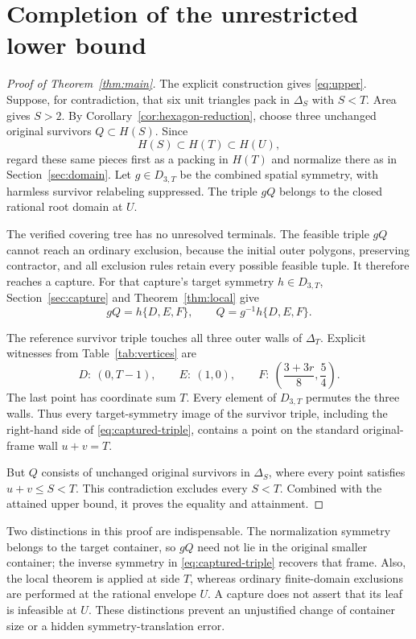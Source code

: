 \documentclass[11pt]{article}
\begin{document}
\section{Completion of the unrestricted lower bound}\label{sec:completion}

\begin{proof}[Proof of Theorem~\ref{thm:main}]
The explicit construction gives \eqref{eq:upper}. Suppose, for contradiction, that six unit triangles pack in $\Delta_S$ with $S<T$. Area gives $S>2$. By Corollary~\ref{cor:hexagon-reduction}, choose three unchanged original survivors $Q\subset H(S)$. Since
\[
 H(S)\subset H(T)\subset H(U),
\]
regard these same pieces first as a packing in $H(T)$ and normalize there as in Section~\ref{sec:domain}. Let $g\in D_{3,T}$ be the combined spatial symmetry, with harmless survivor relabeling suppressed. The triple $gQ$ belongs to the closed rational root domain at $U$.

The verified covering tree has no unresolved terminals. The feasible triple $gQ$ cannot reach an ordinary exclusion, because the initial outer polygons, preserving contractor, and all exclusion rules retain every possible feasible tuple. It therefore reaches a capture. For that capture's target symmetry $h\in D_{3,T}$, Section~\ref{sec:capture} and Theorem~\ref{thm:local} give
\begin{equation}\label{eq:captured-triple}
 gQ=h\{D,E,F\},\qquad Q=g^{-1}h\{D,E,F\}.
\end{equation}

The reference survivor triple touches all three outer walls of $\Delta_T$. Explicit witnesses from Table~\ref{tab:vertices} are
\begin{equation}\label{eq:wall-witnesses}
 D:\ (0,T-1),\qquad
 E:\ (1,0),\qquad
 F:\ \left(\frac{3+3r}{8},\frac54\right).
\end{equation}
The last point has coordinate sum $T$. Every element of $D_{3,T}$ permutes the three walls. Thus every target-symmetry image of the survivor triple, including the right-hand side of \eqref{eq:captured-triple}, contains a point on the standard original-frame wall $u+v=T$.

But $Q$ consists of unchanged original survivors in $\Delta_S$, where every point satisfies $u+v\le S<T$. This contradiction excludes every $S<T$. Combined with the attained upper bound, it proves the equality and attainment.
\end{proof}

Two distinctions in this proof are indispensable. The normalization symmetry belongs to the target container, so $gQ$ need not lie in the original smaller container; the inverse symmetry in \eqref{eq:captured-triple} recovers that frame. Also, the local theorem is applied at side $T$, whereas ordinary finite-domain exclusions are performed at the rational envelope $U$. A capture does not assert that its leaf is infeasible at $U$. These distinctions prevent an unjustified change of container size or a hidden symmetry-translation error.
\end{document}
